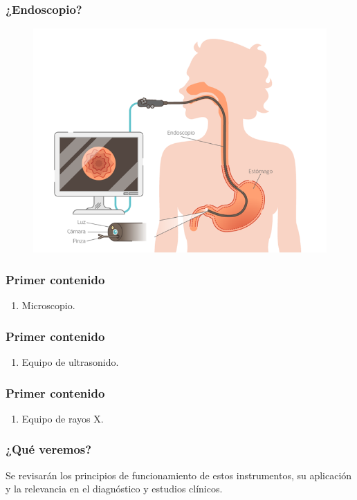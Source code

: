 \documentclass[14pt]{beamer}
\begin{document}
\begin{frame}
\frametitle{¿Endoscopio?}
\begin{figure}
    \centering
    \includegraphics[scale=0.3]{Imagenes/Instrumentacion_03.png}
\end{figure}
\end{frame}
\begin{frame}
\frametitle{Primer contenido}
\vspace*{-1cm}
\begin{enumerate}[<+->]
\conti
\item Microscopio.
\seti
\end{enumerate}
\end{frame}
\begin{frame}
\frametitle{Primer contenido}
\vspace*{-1cm}
\begin{enumerate}[<+->]
\conti
\item Equipo de ultrasonido.
\seti
\end{enumerate}
\end{frame}
\begin{frame}
\frametitle{Primer contenido}
\vspace*{-1cm}
\begin{enumerate}[<+->]
\conti
\item Equipo de rayos X.
\end{enumerate}
\end{frame}
\begin{frame}
\frametitle{¿Qué veremos?}
Se revisarán los principios de funcionamiento de estos instrumentos, \pause su aplicación y la relevancia en el diagnóstico y estudios clínicos.
\end{frame}
\end{document}
